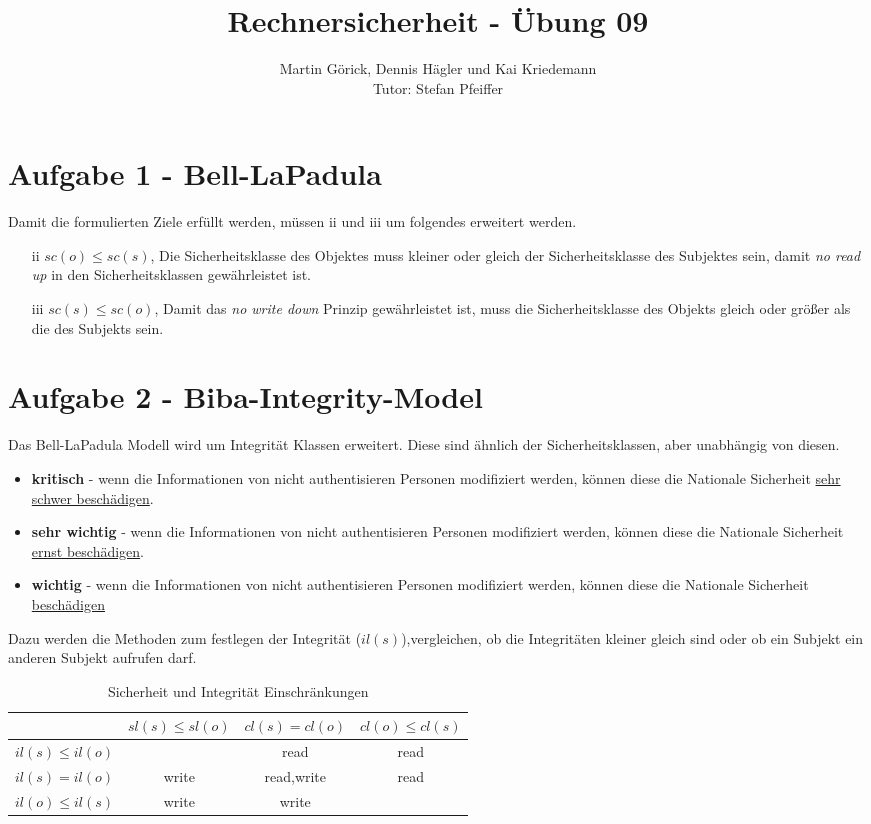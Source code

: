 \documentclass{scrartcl}
\title{Rechnersicherheit - Übung 09}
\author{Martin Görick, Dennis Hägler und Kai Kriedemann \\ Tutor: Stefan Pfeiffer}
\begin{document}
\maketitle


\section*{Aufgabe 1 - Bell-LaPadula}
Damit die formulierten Ziele erfüllt werden, müssen ii und iii um folgendes erweitert werden.

\begin{itemize}
\item[ii] $sc(o) \leq sc(s)$, Die Sicherheitsklasse des Objektes muss kleiner oder gleich der Sicherheitsklasse des Subjektes sein, damit \textit{no read up} in den Sicherheitsklassen gewährleistet ist.
\item[iii] $sc(s) \leq sc(o)$, Damit das \textit{no write down} Prinzip gewährleistet ist, muss die Sicherheitsklasse des Objekts gleich oder größer als die des Subjekts sein.
\end{itemize}

\section*{Aufgabe 2 - Biba-Integrity-Model}

Das Bell-LaPadula Modell wird um Integrität Klassen erweitert. Diese sind ähnlich der Sicherheitsklassen, aber unabhängig von diesen.

\begin{itemize}
\item \textbf{kritisch} - wenn die Informationen von nicht authentisieren Personen modifiziert werden, können diese die Nationale Sicherheit \underline{sehr schwer beschädigen}.
\item \textbf{sehr wichtig} - wenn die Informationen von nicht authentisieren Personen modifiziert werden, können diese die Nationale Sicherheit \underline{ernst beschädigen}.
\item \textbf{wichtig} - wenn die Informationen von nicht authentisieren Personen modifiziert werden, können diese die Nationale Sicherheit \underline{beschädigen}
\end{itemize}

Dazu werden die Methoden zum festlegen der Integrität ($il(s)$),vergleichen, ob die Integritäten kleiner gleich sind oder ob ein Subjekt ein anderen Subjekt aufrufen darf.

\begin{table}[H]
\begin{center}
\begin{tabular}{c|c|c|c}
 & $sl(s) \leq sl(o)$ & $cl(s) = cl(o)$ & $cl(o) \leq cl(s)$ \\
 \hline
 $il(s) \leq il(o)$ & & read & read \\
 \hline
 $il(s) = il(o)$ & write &  read,write & read \\
\hline
$il(o) \leq il(s)$ & write & write & \\
\end{tabular}
\end{center}
\caption{Sicherheit und Integrität Einschränkungen}
\label{tab:2}
\end{table}
\end{document}
